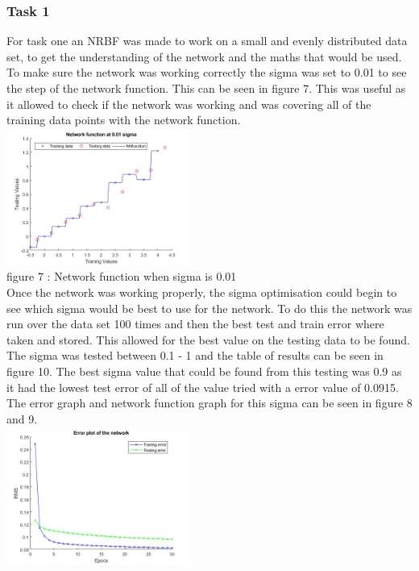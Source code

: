\documentclass{IEEEtran}[11pt]
\begin{document}
\subsubsection{Task 1}
\begin{flushleft}
  For task one an NRBF was made to work on a small and evenly distributed data
  set, to get the understanding of the network and the maths that would be used.
  To make sure the network was working correctly the sigma was set to 0.01 to
  see the step of the network function. This can be seen in figure 7. This was
  useful as it allowed to check if the network was working and was covering all
  of the training data points with the network function.
  \vspace{1.5mm}
  \\
  \includegraphics[width = 0.45\textwidth]{NNstepfunction.jpg}
  \\
  \vspace{1.5mm}
  {\footnotesize figure 7 : Network function when sigma is 0.01 }
  \\
  \vspace{1.5mm}
  Once the network was working properly, the sigma optimisation could begin to
  see which sigma would be best to use for the network. To do this the network
  was run over the data set 100 times and then the best test and train error
  where taken and stored. This allowed for the best value on the testing data to
  be found. The sigma was tested between 0.1 - 1 and the table of results can be
  seen in figure 10. The best sigma value that could be found from this testing
  was 0.9 as it had the lowest test error of all of the value tried with a error
  value of 0.0915. The error graph and network function graph for this sigma
  can be seen in figure 8 and 9.
  \\
  \vspace{1.5mm}
  \includegraphics[width = 0.45\textwidth]{Errorplottask1.jpg}

\end{flushleft}
\end{document}
